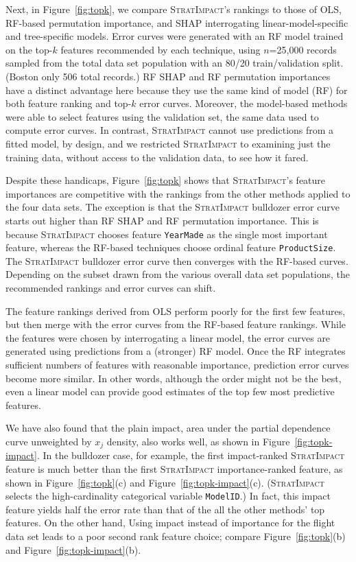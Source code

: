 \documentclass[11pt]{article}
\newcommand{\figref}[1]{Figure~\ref{#1}}
\newcommand{\todo}[1]{{{\color{red}{[#1]}}}}
\newcommand{\simp}{\fontfamily{cmr}\textsc{\small StratImpact}}
\begin{document}
Next, in \figref{fig:topk}, we compare \simp{}'s rankings to those of OLS, RF-based permutation importance, and SHAP interrogating linear-model-specific and tree-specific models. Error curves were generated with an RF model trained on the top-$k$ features recommended by each technique, using $n$=25,000 records sampled from the total data set population with an 80/20 train/validation split. (Boston only 506  total records.) RF SHAP and RF permutation importances have a distinct advantage here because they use the same kind of model (RF) for both feature ranking and top-$k$ error curves. Moreover, the model-based methods were able to select features using the validation set, the same data used to compute error curves. In contrast, \simp{} cannot use predictions from a fitted model, by design, and we restricted \simp{} to examining just the training data, without access to the validation data, to see how it fared. 

Despite these handicaps, \figref{fig:topk} shows that \simp{}'s feature importances are competitive with the rankings from the other methods  applied to the four data sets.   The exception is that the \simp{} bulldozer error curve starts out higher than RF SHAP and RF permutation importance. This is because \simp{} chooses feature {\tt YearMade} as the single most important feature, whereas the RF-based techniques choose ordinal feature {\tt ProductSize}. \todo{tie into importance graphs} The \simp{} bulldozer error curve then converges with the RF-based curves.  Depending on the subset drawn from the various overall data set populations, the recommended rankings and error curves can shift.

The feature rankings derived from OLS perform poorly for the first few features, but then merge with the error curves from the RF-based feature rankings.  While the features were chosen by interrogating a linear model, the error curves are generated using predictions from a (stronger) RF model. Once the RF integrates sufficient numbers of features with reasonable importance, prediction error curves become more similar.  In other words, although the order might not be the best, even a linear model can provide good estimates of the top few most  predictive features.

We have also found that the plain impact, area under the partial dependence curve unweighted by $x_j$ density, also works well, as shown in \figref{fig:topk-impact}.  In the bulldozer case, for example, the first impact-ranked \simp{} feature is much better than the first \simp{} importance-ranked feature, as shown in \figref{fig:topk}(c) and \figref{fig:topk-impact}(c). (\simp{} selects the high-cardinality categorical variable {\tt ModelID}.) In fact, this impact feature yields half the error rate than that of the all the other methods' top features. On the other hand, Using impact instead of importance for the flight data set leads to a poor second rank feature choice; compare \figref{fig:topk}(b) and \figref{fig:topk-impact}(b).
\end{document}

